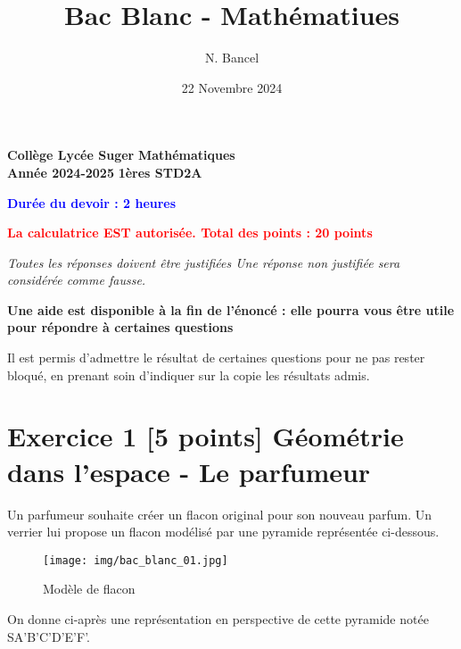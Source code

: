 \documentclass{exam}
\title{Bac Blanc - Mathématiues}
\author{N. Bancel}
\date{22 Novembre 2024}
\begin{document}
\textbf{Collège Lycée Suger}
\hfill
\textbf{Mathématiques} \\

\textbf{Année 2024-2025}
\hfill
\textbf{1ères STD2A} \par

{\let\newpage\relax\maketitle}


\begin{center}
  \textbf{\textcolor{blue}{Durée du devoir : 2 heures}} \par
  \vspace{1em}
  \textbf{\textcolor{red}{La calculatrice EST autorisée. Total des points : 20 points}} \par
  \vspace{1em}
\end{center}

\begin{tcolorbox}[colback=gray!10!white, colframe=gray, title=Note importante]
  \itshape{Toutes les réponses doivent être justifiées} Une réponse non justifiée sera considérée comme fausse. \par
  \vspace{1em}  
  \textbf{Une aide est disponible à la fin de l'énoncé : elle pourra vous être utile pour répondre à certaines questions} \par
  \vspace{1em}  
  Il est permis d'admettre le résultat de certaines questions pour ne pas rester bloqué, en prenant soin d'indiquer sur la copie les résultats admis.
\end{tcolorbox}

\section*{Exercice 1 [5 points] Géométrie dans l'espace - Le parfumeur}

Un parfumeur souhaite créer un flacon original pour son nouveau parfum.
Un verrier lui propose un flacon modélisé par une pyramide représentée ci-dessous.

\begin{figure}[H]
  \centering
  \texttt{[image: img/bac\_blanc\_01.jpg]}
  \caption{\label{} Modèle de flacon}
\end{figure}

On donne ci-après une représentation en perspective de cette pyramide notée SA'B'C'D'E'F'.
\end{document}
